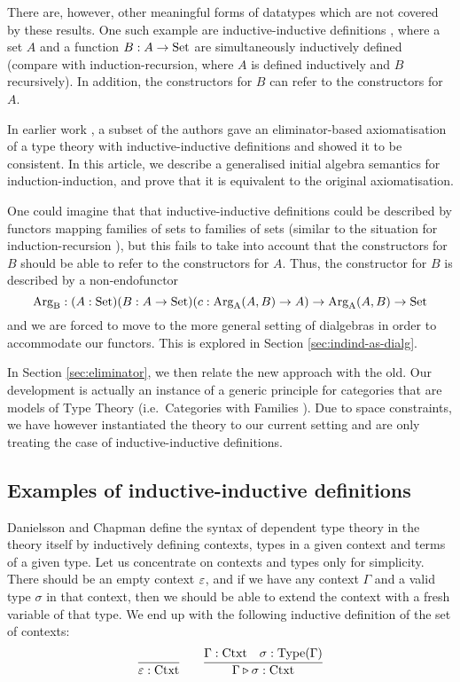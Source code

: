\documentclass[orivec,envcountsame, ,envcountsect]{llncs}
\begin{document}
There are, however, other meaningful forms of datatypes which are not
covered by these results. One such example are inductive-inductive
definitions \cite{nordvallforsbergSetzer2010indind}, where a set $A$
and a function $B : A \to \text{Set}$ are simultaneously inductively defined
(compare with induction-recursion, where $A$ is defined inductively
and $B$ recursively). In addition, the constructors for $B$ can refer
to the constructors for $A$.


In earlier work \cite{nordvallforsbergSetzer2010indind}, a subset of
the authors gave an eliminator-based axiomatisation of a type theory
with inductive-inductive definitions and showed it to be
consistent. In this article, we describe a generalised initial algebra
semantics for induction-induction, and prove that it is equivalent to
the original axiomatisation.

One could imagine that that inductive-inductive definitions could be
described by functors mapping families of sets to families of sets
(similar to the situation for induction-recursion
\cite{dybjersetzer2003inalg}), but this fails to take into account
that the constructors for $B$ should be able to refer to the
constructors for $A$. Thus, the constructor for $B$ is described by a
non-endofunctor
\[
\text{Arg}_{\text{B}} : (A : \text{Set})(B : A \to \text{Set})(c : \text{Arg}_{\text{A}}(A, B) \to A) \to \text{Arg}_{\text{A}}(A, B) \to \text{Set}
\]
and we are forced to move to the more general setting of dialgebras
\cite{hagino1987phdthesis,fokkinga1996datatypeLaws,pollZwanenburg2001dialgebra}
in order to accommodate our functors. This is explored in Section \ref{sec:indind-as-dialg}.

In Section \ref{sec:eliminator}, we then relate the new approach with
the old. Our development is actually an instance of a generic
principle for categories that are models of Type Theory (i.e.\
Categories with Families \cite{dybjer1996internalTT}). Due to space
constraints, we have however instantiated the theory to our current
setting and are only treating the case of inductive-inductive
definitions.


\subsection{Examples of inductive-inductive definitions}
\label{sec:ex-indind}

Danielsson \cite{danielsson2007formalisation} and Chapman
\cite{chapman2009eatitself} define the syntax of dependent type theory
in the theory itself by inductively defining contexts, types in a
given context and terms of a given type. Let us concentrate on
contexts and types only for simplicity. There should be an empty
context $\varepsilon$, and if we have any context $\Gamma$ and a valid
type $\sigma$ in that context, then we should be able to extend the
context with a fresh variable of that type. We end up with the
following inductive definition of the set of contexts:
\[
\infer{\emptyCtxt : \Ctxt}{} \qquad
\infer{\consCtxt{\Gamma}{\sigma} : \Ctxt}{\Gamma : \Ctxt & \sigma : \Type(\Gamma)}
\]
\end{document}
